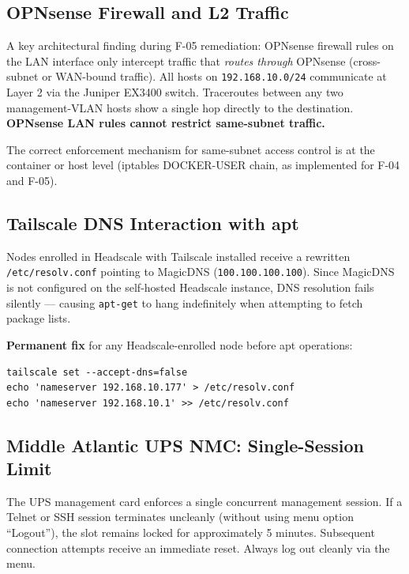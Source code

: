 \documentclass[11pt,a4paper]{article}
\begin{document}
\subsection{OPNsense Firewall and L2 Traffic}

A key architectural finding during F-05 remediation: OPNsense firewall rules on the LAN
interface only intercept traffic that \textit{routes through} OPNsense (cross-subnet or
WAN-bound traffic). All hosts on \texttt{192.168.10.0/24} communicate at Layer 2 via the
Juniper EX3400 switch. Traceroutes between any two management-VLAN hosts show a single hop
directly to the destination. \textbf{OPNsense LAN rules cannot restrict same-subnet traffic.}

The correct enforcement mechanism for same-subnet access control is at the container or
host level (iptables DOCKER-USER chain, as implemented for F-04 and F-05).

\subsection{Tailscale DNS Interaction with apt}

Nodes enrolled in Headscale with Tailscale installed receive a rewritten
\texttt{/etc/resolv.conf} pointing to MagicDNS (\texttt{100.100.100.100}). Since MagicDNS
is not configured on the self-hosted Headscale instance, DNS resolution fails silently —
causing \texttt{apt-get} to hang indefinitely when attempting to fetch package lists.

\textbf{Permanent fix} for any Headscale-enrolled node before apt operations:
\begin{lstlisting}
tailscale set --accept-dns=false
echo 'nameserver 192.168.10.177' > /etc/resolv.conf
echo 'nameserver 192.168.10.1' >> /etc/resolv.conf
\end{lstlisting}

\subsection{Middle Atlantic UPS NMC: Single-Session Limit}

The UPS management card enforces a single concurrent management session. If a Telnet or SSH
session terminates uncleanly (without using menu option ``Logout''), the slot remains locked
for approximately 5 minutes. Subsequent connection attempts receive an immediate reset.
Always log out cleanly via the menu.

\end{document}
